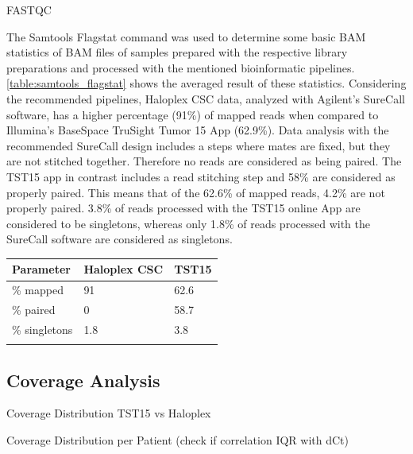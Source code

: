 FASTQC


\begin{minipage}{0.5\textwidth}
The Samtools Flagstat command was used to determine some basic BAM statistics of BAM
files of samples prepared with the respective library preparations and processed with
the mentioned bioinformatic pipelines. \ref{table:samtools_flagstat} shows the
averaged result of these statistics. Considering the recommended pipelines, Haloplex
CSC data, analyzed with Agilent's SureCall software, has a higher percentage (91\%) of mapped
reads when compared to Illumina's BaseSpace TruSight Tumor 15 App (62.9\%). Data analysis
with the recommended SureCall design includes a steps where mates are fixed, but they
are not stitched together. Therefore no reads are considered as being paired. The TST15 app
in contrast includes a read stitching step and 58\% are considered as properly paired.
This means that of the 62.6\% of mapped reads, 4.2\% are not properly paired. 3.8\%
of reads processed with the TST15 online App are considered to be singletons, whereas
only 1.8\% of reads processed with the SureCall software are considered as singletons.
\end{minipage}
\hfill
\begin{minipage}{0.5\textwidth}
\begin{tabular}{p{3cm} p{1.5cm} p{1.5cm}}\\
\hline
Parameter & Haloplex CSC & TST15 \\
\hline
\% mapped & 91 & 62.6 \\
\% paired & 0 & 58.7 \\
\% singletons & 1.8 & 3.8 \\
\label{samtools_flagstat}
\end{tabular}
\end{minipage}

\subsection{Coverage Analysis}

Coverage Distribution TST15 vs Haloplex

Coverage Distribution per Patient (check if correlation IQR with dCt)

